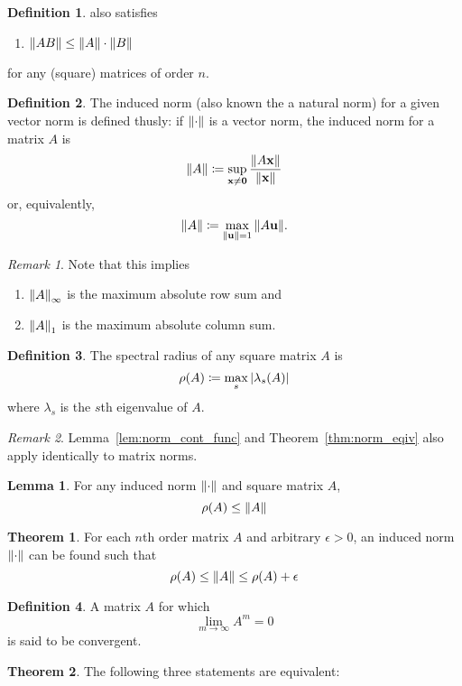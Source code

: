 \documentclass[11pt,letterpaper]{article}
\numberwithin{figure}{section} %
\newcommand{\keyword}[1]{\colorbox{cyan!20!}{#1}}
\theoremstyle{definition}
\newtheorem{theorem}{Theorem}[subsection]
\theoremstyle{definition}
\theoremstyle{definition}
\newtheorem{lemma}{Lemma}[subsection]
\theoremstyle{definition}
\newtheorem{definition}{Definition}[subsection]
\theoremstyle{definition}
\theoremstyle{remark}
\newtheorem*{remark}{Remark}
\theoremstyle{remark}
\theoremstyle{definition}
\theoremstyle{remark}
\theoremstyle{remark}
\begin{document}
\begin{multicols*}{3}
\begin{definition}
	also satisfies 
	\begin{enumerate}[label={(\roman*)}, start=4]
		\item $\norm{AB} \leq \norm{A} \cdot \norm{B}$
	\end{enumerate}
	for any (square) matrices of order $n$.
\end{definition}
\begin{definition}
	The \keyword{induced norm} (also known the a natural norm) for a given vector
	norm is defined thusly: if $\norm{\cdot}$ is a vector norm, the induced norm
	for a matrix $A$ is
	\[
		\norm{A} \coloneqq \sup_{\vb{x}\neq \vb{0}} \frac{\norm{A\vb{x}}}{\norm{\vb{x}}}
	\]
	or, equivalently,
	\[
		\norm{A} \coloneqq \max_{\norm{\vb{u}}=1} \norm{A\vb{u}}.
	\]
\end{definition}
\begin{remark}
	Note that this implies 
	\begin{enumerate}[label={(\Alph*)}]
		\item $\norm{A}_\infty$ is the maximum absolute row sum and
		\item $\norm{A}_1$ is the maximum absolute column sum.
	\end{enumerate}
\end{remark}
\begin{definition}
	The \keyword{spectral radius} of any square matrix $A$ is
	\[
		\rho(A) \coloneqq \max_s \abs{\lambda_s(A)}
	\]
	where $\lambda_s$ is the $s$th eigenvalue of $A$.
\end{definition}
\begin{remark}
	Lemma~\ref{lem:norm_cont_func} and Theorem~\ref{thm:norm_eqiv} also apply
	identically to matrix norms.
\end{remark}
\begin{lemma}
	For any induced norm $\norm{\cdot}$ and square matrix $A$, 
	\[
		\rho(A) \leq \norm{A}
	\]
\end{lemma}
\begin{theorem}
	For each $n$th order matrix $A$ and arbitrary $\epsilon > 0$, an induced norm
	$\norm{\cdot}$ can be found such that
	\[
		\rho(A) \leq \norm{A} \leq \rho(A) + \epsilon
	\]
\end{theorem}
\begin{definition}
	A matrix $A$ for which
	\[
		\lim_{m\to\infty} A^m = 0
	\]
	is said to be \keyword{convergent}.
\end{definition}
\begin{theorem}
	The following three statements are equivalent:
	\begin{enumerate}[label={(\alph*)}]

\end{enumerate}
\end{theorem}
\end{multicols*}
\end{document}
